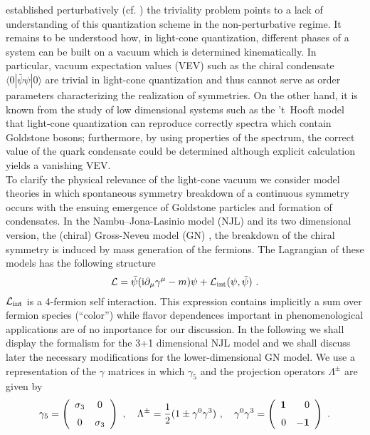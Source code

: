 \documentclass[a4paper,12pt]{article}
\begin{document}
established perturbatively (cf. \cite{BPP98}) the triviality problem points to a lack of
understanding of this quantization scheme in the non-perturbative regime. It remains to be
understood how, in light-cone quantization,  different phases of a system can be built on a
vacuum which is determined kinematically. In particular, vacuum expectation values (VEV)
such as the chiral condensate $\langle 0 |\bar{\psi}\psi|0\rangle$ are trivial in light-cone
quantization and thus cannot serve as order parameters characterizing the realization of
symmetries. On the other hand, it is known from the study of low dimensional systems
such as the 't~Hooft model \cite{tHooft74} that light-cone quantization can reproduce correctly
spectra which
contain Goldstone bosons; furthermore, by using properties of the spectrum, the
correct value of the quark condensate could be determined \cite{Zhitnitsky} although
explicit calculation yields a vanishing VEV. \\
To clarify the physical relevance of the light-cone vacuum we
consider model theories in which spontaneous symmetry breakdown
of a continuous symmetry  occurs with the ensuing emergence of
Goldstone particles and formation of condensates. In the
Nambu--Jona-Lasinio model (NJL) \cite{NJL61} and its two dimensional
version, the (chiral) Gross-Neveu model (GN) \cite{GN74}, the breakdown of the chiral symmetry
is induced by mass generation of the fermions. The Lagrangian of these models has the following
structure
$${\cal L}= \bar{\psi}({\rm i}\partial_{\mu}\gamma^{\mu}-m)\psi+{\cal L}_{\rm int}
(\psi,\bar{\psi}) \ .$$
${\cal L}_{\rm int}$ is a 4-fermion self interaction.
This expression contains implicitly a sum over  fermion species (``color'') while flavor
dependences important in phenomenological applications are of no importance for our discussion.
In the following we shall display the formalism for the 3+1 dimensional NJL model and we shall
discuss later the necessary modifications for the lower-dimensional GN model.
We use a representation of the $\gamma$ matrices in which $\gamma_{5}$ and the projection
operators $\Lambda^{\pm}$ are given by
\begin{equation}
\label{gamma}
  \gamma_{{5}}=\left (\begin {array}{cc} \sigma_{3}&0\\\noalign{\medskip} 0&\sigma_{3}
\end {array}\right )\ ,\quad \Lambda^{\pm}=\frac{1}{2}(1\pm \gamma^{0}\gamma^{3})\ ,\quad
 \gamma^{0}\gamma^{3}=\left (\begin {array}{rr} {\bf 1}&0\\\noalign{\medskip} 0&{\bf -1}
\end{array}\right )\ .
\end{equation}
\end{document}
